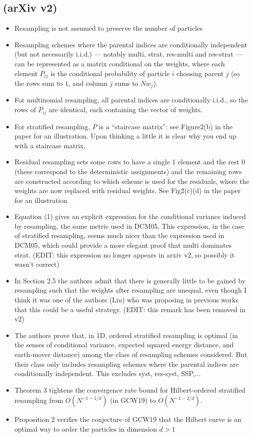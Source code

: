 \documentclass{article}
\begin{document}
\subsection*{\cite{li2020} (arXiv v2)}
\begin{itemize}
\item Resampling is not assumed to preserve the number of particles
\item Resampling schemes where the parental indices are conditionally independent (but not necessarily i.i.d.) --- notably multi, strat, res-multi and res-strat --- can be represented as a matrix conditional on the weights, where each element $P_{ij}$ is the conditional probability of particle $i$ choosing parent $j$ (so the rows sum to $1$, and column $j$ sums to $Nw_j$).
\item For multinomial resampling, all parental indices are conditionally i.i.d., so the rows of $P_{ij}$ are identical, each containing the vector of weights.
\item For stratified resampling, $P$ is a ``staircase matrix'': see Figure2(b) in the paper for an illustration. Upon thinking a little it is clear why you end up with a staircase matrix.
\item Residual resampling sets some rows to have a single $1$ element and the rest $0$ (these correspond to the deterministic assignments) and the remaining rows are constructed according to which scheme is used for the residuals, where the weights are now replaced with residual weights. See Fig2(c)(d) in the paper for an illustration
\item Equation (1) gives an explicit expression for the conditional variance induced by resampling, the same metric used in DCM05. This expression, in the case of stratified resampling, seems much nicer than the expression used in DCM05, which could provide a more elegant proof that multi dominates strat. (EDIT: this expression no longer appears in arxiv v2, so possibly it wasn't correct)
\item In Section 2.5 the authors admit that there is generally little to be gained by resampling such that the weights after resampling are unequal, even though I think it was one of the authors (Liu) who was proposing in previous works that this could be a useful strategy. (EDIT: this remark has been removed in v2)
\item The authors prove that, in 1D, ordered stratified resampling is optimal (in the senses of conditional variance, expected squared energy distance, and earth-mover distance) among the class of resampling schemes considered. But their class only includes resampling schemes where the parental indices are conditionally independent. This excludes syst, res-syst, SSP,...
\item Theorem 3 tightens the convergence rate bound for Hilbert-ordered stratified resampling from $O(N^{-1-1/d})$ (in GCW19) to $O(N^{-1-2/d})$.
\item Proposition 2 verifies the conjecture of GCW19 that the Hilbert curve is an optimal way to order the particles in dimension $d>1$
\end{itemize}
\end{document}
